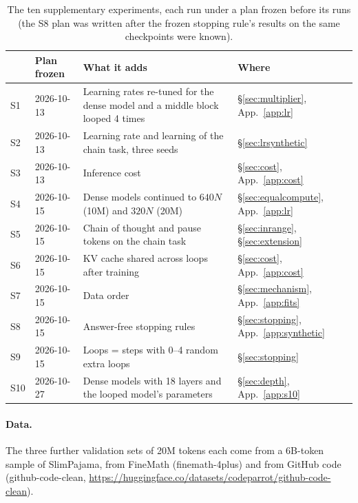 \begin{table}[h]
  \centering
  \caption{The ten supplementary experiments, each run under a plan frozen before its runs (the S8 plan was written after
  the frozen stopping rule's results on the same checkpoints were known).}
  \label{tab:supp}
  \footnotesize
  \begin{tabular}{llll}
    \toprule
    & Plan frozen & What it adds & Where \\
    \midrule
    S1  & 2026-10-13 & Learning rates re-tuned for the dense model and a middle block looped 4 times & \S\ref{sec:multiplier}, App.~\ref{app:lr} \\
    S2  & 2026-10-13 & Learning rate and learning of the chain task, three seeds & \S\ref{sec:lrsynthetic} \\
    S3  & 2026-10-13 & Inference cost & \S\ref{sec:cost}, App.~\ref{app:cost} \\
    S4  & 2026-10-15 & Dense models continued to $640N$ (10M) and $320N$ (20M) & \S\ref{sec:equalcompute}, App.~\ref{app:lr} \\
    S5  & 2026-10-15 & Chain of thought and pause tokens on the chain task & \S\ref{sec:inrange}, \S\ref{sec:extension} \\
    S6  & 2026-10-15 & KV cache shared across loops after training & \S\ref{sec:cost}, App.~\ref{app:cost} \\
    S7  & 2026-10-15 & Data order & \S\ref{sec:mechanism}, App.~\ref{app:fits} \\
    S8  & 2026-10-15 & Answer-free stopping rules & \S\ref{sec:stopping}, App.~\ref{app:synthetic} \\
    S9  & 2026-10-15 & Loops = steps with 0--4 random extra loops & \S\ref{sec:stopping} \\
    S10 & 2026-10-27 & Dense models with 18 layers and the looped model's parameters & \S\ref{sec:depth}, App.~\ref{app:s10} \\
    \bottomrule
  \end{tabular}
\end{table}

\paragraph{Data.} The three further validation sets of 20M tokens each come from a 6B-token sample of SlimPajama, from
FineMath (finemath-4plus) and from GitHub code (github-code-clean,
\url{https://huggingface.co/datasets/codeparrot/github-code-clean}).

